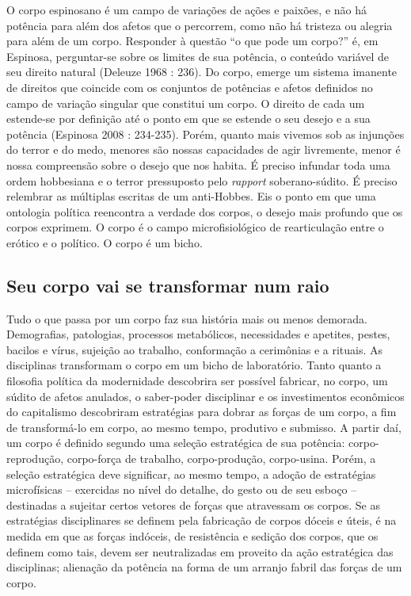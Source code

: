 O corpo espinosano é um campo de variações de ações e paixões, e não há
potência para além dos afetos que o percorrem, como não há tristeza ou
alegria para além de um corpo. Responder à questão ``o que pode um
corpo?'' é, em Espinosa, perguntar-se sobre os limites de sua potência,
o conteúdo variável de seu direito natural (Deleuze 1968 : 236). Do
corpo, emerge um sistema imanente de direitos que coincide com os
conjuntos de potências e afetos definidos no campo de variação singular
que constitui um corpo. O direito de cada um estende-se por definição
até o ponto em que se estende o seu desejo e a sua potência (Espinosa
2008 : 234-235). Porém, quanto mais vivemos sob as injunções do terror e
do medo, menores são nossas capacidades de agir livremente, menor é
nossa compreensão sobre o desejo que nos habita. É preciso infundar toda
uma ordem hobbesiana e o terror pressuposto pelo \emph{rapport
}soberano-súdito. É preciso relembrar as múltiplas escritas de um
anti-Hobbes. Eis o ponto em que uma ontologia política reencontra a
verdade dos corpos, o desejo mais profundo que os corpos exprimem. O
corpo é o campo microfisiológico de rearticulação entre o erótico e o
político. O corpo é um bicho.

\subsection{Seu corpo vai se transformar num raio}

Tudo o que passa por um
corpo faz sua história mais ou menos demorada. Demografias, patologias,
processos metabólicos, necessidades e apetites, pestes, bacilos e vírus,
sujeição ao trabalho, conformação a cerimônias e a rituais. As
disciplinas transformam o corpo em um bicho de laboratório. Tanto quanto
a filosofia política da modernidade descobrira ser possível fabricar, no
corpo, um súdito de afetos anulados, o saber-poder disciplinar e os
investimentos econômicos do capitalismo descobriram estratégias para
dobrar as forças de um corpo, a fim de transformá-lo em corpo, ao mesmo
tempo, produtivo e submisso. A partir daí, um corpo é definido segundo
uma seleção estratégica de sua potência: corpo-reprodução, corpo-força
de trabalho, corpo-produção, corpo-usina. Porém, a seleção estratégica
deve significar, ao mesmo tempo, a adoção de estratégias microfísicas --
exercidas no nível do detalhe, do gesto ou de seu esboço -- destinadas a
sujeitar certos vetores de forças que atravessam os corpos. Se as
estratégias disciplinares se definem pela fabricação de corpos dóceis e
úteis, é na medida em que as forças indóceis, de resistência e sedição
dos corpos, que os definem como tais, devem ser neutralizadas em
proveito da ação estratégica das disciplinas; alienação da potência na
forma de um arranjo fabril das forças de um corpo.

